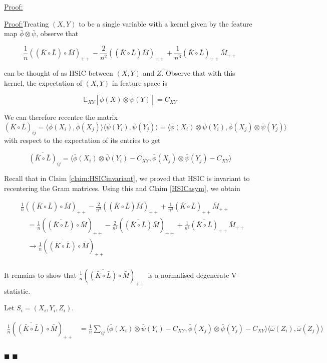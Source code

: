 \documentclass[12pt]{article}
\newenvironment{claimproof}[1]{\par\noindent\underline{Proof:}\space#1}{\hfill $\blacksquare$}
\numberwithin{claim}{section}
\numberwithin{lemma}{section}
\numberwithin{theorem}{section}
\begin{document}
\begin{claimproof}
\begin{claimproof}

Treating $(X,Y)$ to be a single variable with a kernel given by the feature map $\bar{\phi}\otimes \bar{\psi}$, observe that 

\[\frac{1}{n}((\bar{K}\circ \bar{L}) \circ \bar{M})_{++} - \frac{2}{n^2}((\bar{K}\circ \bar{L})\bar{M})_{++} + \frac{1}{n^3}(\bar{K}\circ \bar{L})_{++}\bar{M}_{++}\]

can be thought of as HSIC between $(X,Y)$ and $Z$. Observe that with this kernel, the expectation of $(X,Y)$ in feature space is 

\[\mathbb{E}_{XY}[\bar{\phi}(X)\otimes \bar{\psi}(Y)] = C_{XY}\]

We can therefore recentre the matrix $(\bar{K}\circ \bar{L})_{ij} = \langle \bar{\phi}(X_i),\bar{\phi}(X_j)\rangle \langle \bar{\psi}(Y_i) ,\bar{\psi}(Y_j)\rangle = \langle \bar{\phi}(X_i)\otimes \bar{\psi}(Y_i),\bar{\phi}(X_j)\otimes \bar{\psi}(Y_j)\rangle$ with respect to the expectation of its entries to get 

\[\overline{(\bar{K}\circ \bar{L})}_{ij} =  \langle \bar{\phi}(X_i)\otimes \bar{\psi}(Y_i) - C_{XY},\bar{\phi}(X_j)\otimes \bar{\psi}(Y_j) - C_{XY}\rangle\]

Recall that in Claim \ref{claim:HSICinvariant}, we proved that HSIC is invariant to recentering the Gram matrices. Using this and Claim \ref{HSICasym}, we obtain


\begin{align*}
&\frac{1}{n}((\bar{K}\circ \bar{L}) \circ \bar{M})_{++} - \frac{2}{n^2}((\bar{K}\circ \bar{L})\bar{M})_{++} + \frac{1}{n^3}(\bar{K}\circ \bar{L})_{++}\bar{M}_{++} \\ &\quad 
= \frac{1}{n}(\overline{(\bar{K}\circ \bar{L})} \circ \bar{M})_{++} - \frac{2}{n^2}(\overline{(\bar{K}\circ \bar{L})}\bar{M})_{++} + \frac{1}{n^3}\overline{(\bar{K}\circ \bar{L})}_{++}\bar{M}_{++} \\ &\quad 
\longrightarrow \frac{1}{n}(\overline{(\bar{K}\circ \bar{L})} \circ \bar{M})_{++}  \\
\end{align*}

It remains to show that $ \frac{1}{n}(\overline{(\bar{K}\circ \bar{L})} \circ \bar{M})_{++} $ is a normalised degenerate V-statistic.

Let $S_i = (X_i,Y_i,Z_i)$.

\begin{align*}
\frac{1}{n}(\overline{(\bar{K}\circ \bar{L})} \circ \bar{M})_{++} & = \frac{1}{n} \sum_{ij} \langle \bar{\phi}(X_i) \otimes \bar{\psi}(Y_i) - C_{XY},\bar{\phi}(X_j) \otimes \bar{\psi}(Y_j) - C_{XY} \rangle \langle \bar{\omega}(Z_i), \bar{\omega}(Z_j) \rangle \\
\end{align*}


\end{claimproof}
\end{claimproof}
\end{document}
